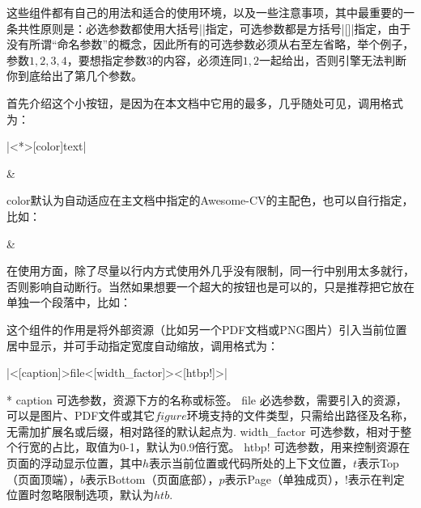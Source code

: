 这些组件都有自己的用法和适合的使用环境，以及一些注意事项，其中最重要的一条共性原则是：必选参数都使用大括号|{}|指定，可选参数都是方括号|[]|指定，由于{\LaTeXe}没有所谓“命名参数”的概念，因此所有的可选参数必须从右至左省略，举个例子，参数$1,2,3,4$，要想指定参数$3$的内容，必须连同$1,2$一起给出，否则引擎无法判断你到底给出了第几个参数。

首先介绍这个小按钮，是因为在本文档中它用的最多，几乎随处可见，调用格式为：

|\dkbutton<*>[color]{text}|

\begin{center}
   \& 
\end{center}

color默认为自动适应在主文档中指定的Awesome-CV的主配色，也可以自行指定，比如：

\begin{center}
   \& 
\end{center}

在使用方面，除了尽量以行内方式使用外几乎没有限制，同一行中别用太多就行，否则影响自动断行。当然如果想要一个超大的按钮也是可以的，只是推荐把它放在单独一个段落中，比如：

\begin{center}
  \vspace{1em}
  \vspace{1em}
\end{center}

这个组件的作用是将外部资源（比如另一个PDF文档或PNG图片）引入当前位置居中显示，并可手动指定宽度自动缩放，调用格式为：

|\dkresource<[caption]>{file}<[width_factor]><[htbp!]>|

\begin{cvskills}*
  \cvskill
  {caption}
  {可选参数，资源下方的名称或标签。}
  \cvskill
  {file}
  {必选参数，需要引入的资源，可以是图片、PDF文件或其它$figure$环境支持的文件类型，只需给出路径及名称，无需加扩展名或后缀，相对路径的默认起点为.}
  \cvskill
  {width\_factor}
  {可选参数，相对于整个行宽的占比，取值为0-1，默认为0.9倍行宽。}
  \cvskill
  {htbp!}
  {可选参数，用来控制资源在页面的浮动显示位置，其中$h$表示当前位置或代码所处的上下文位置，$t$表示Top（页面顶端），$b$表示Bottom（页面底部），$p$表示Page（单独成页），$!$表示在判定位置时忽略限制选项，默认为$htb$.}
\end{cvskills}

